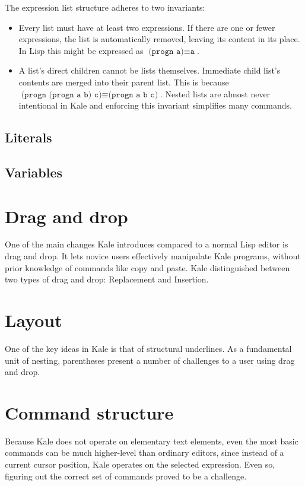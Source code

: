 The expression list structure adheres to two invariants:
\begin{itemize}[noitemsep]
	\item Every list must have at least two expressions. If there are one or
	fewer expressions, the list is automatically removed, leaving its content
	in its place. In Lisp this might be expressed as
	$\texttt{(progn a)} \equiv \texttt{a}$.
	\item A list's direct children cannot be lists themselves. Immediate child
	list's contents are merged into their parent list. This is because
	$\texttt{(progn (progn a b) c)} \equiv \texttt{(progn a b c)}$.
	Nested lists are almost never intentional in Kale and enforcing this
	invariant simplifies many commands.
\end{itemize}

\subsection{Literals}

\subsection{Variables}

\section{Drag and drop}

One of the main changes Kale introduces compared to a normal Lisp editor is
drag and drop. It lets novice users effectively manipulate Kale programs,
without prior knowledge of commands like copy and paste. Kale distinguished
between two types of drag and drop: Replacement and Insertion. 

\section{Layout}

One of the key ideas in Kale is that of structural underlines. As a
fundamental unit of nesting, parentheses present a number of challenges to a
user using drag and drop.

\section{Command structure}

Because Kale does not operate on elementary text elements, even the most
basic
commands can be much higher-level than ordinary editors, since instead of a
current cursor position, Kale operates on the selected expression. Even so,
figuring out the correct set of commands proved to be a challenge.


